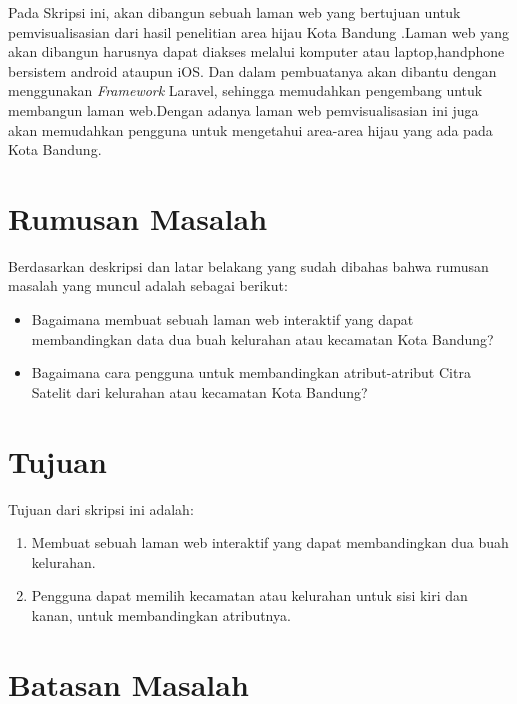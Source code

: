 Pada Skripsi ini, akan dibangun sebuah laman web yang bertujuan untuk pemvisualisasian dari hasil penelitian area hijau Kota Bandung
.Laman web yang akan dibangun harusnya dapat diakses melalui komputer atau laptop,handphone bersistem android ataupun iOS. Dan dalam pembuatanya akan dibantu dengan menggunakan \emph{Framework} Laravel, sehingga memudahkan pengembang untuk membangun laman web.Dengan adanya laman web pemvisualisasian ini juga akan memudahkan pengguna untuk mengetahui area-area hijau yang ada pada Kota Bandung.

\section{Rumusan Masalah}
\label{sec:rumusan}
Berdasarkan deskripsi dan latar belakang yang sudah dibahas bahwa rumusan masalah yang muncul adalah sebagai berikut:

\begin{itemize}
	\item Bagaimana membuat sebuah laman web interaktif yang dapat membandingkan data dua buah kelurahan atau kecamatan Kota Bandung?
	\item Bagaimana cara pengguna untuk membandingkan atribut-atribut Citra Satelit dari kelurahan atau kecamatan Kota Bandung?
\end{itemize}

\section{Tujuan}
\label{sec:tujuan}
Tujuan dari skripsi ini adalah:
\begin{enumerate}
	\item Membuat sebuah laman web interaktif yang dapat membandingkan dua buah kelurahan.
	\item Pengguna dapat memilih kecamatan atau kelurahan untuk sisi kiri dan kanan, untuk membandingkan atributnya.
\end{enumerate}


\section{Batasan Masalah}
\label{sec:batasan}

